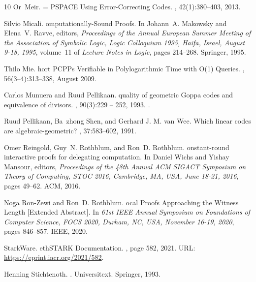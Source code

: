 \begin{thebibliography}{10}
Or~Meir.
 = {{P}{S}{P}{A}{C}{E}} {U}sing {E}rror-{C}orrecting {C}odes.
, 42(1):380--403, 2013.

Silvio Micali.
omputationally-{S}ound {P}roofs.
\newblock In Johann~A. Makowsky and Elena~V. Ravve, editors, {\em Proceedings
  of the Annual European Summer Meeting of the Association of Symbolic Logic,
  Logic Colloquium 1995, Haifa, Israel, August 9-18, 1995}, volume~11 of {\em
  Lecture Notes in Logic}, pages 214--268. Springer, 1995.

Thilo Mie.
hort {P}{C}{P}{P}s {V}erifiable in {P}olylogarithmic {T}ime with
  {O}(1) {Q}ueries.
,
  56(3–4):313–338, August 2009.

Carlos Munuera and Ruud Pellikaan.
quality of geometric {G}oppa codes and equivalence of divisors.
, 90(3):229 -- 252, 1993.
\newblock \href {https://doi.org/10.1016/0022-4049(93)90043-S}
  {}.

Ruud {Pellikaan}, Ba~zhong {Shen}, and Gerhard {J. M. van Wee}.
\newblock Which linear codes are algebraic-geometric?
, 37:583--602, 1991.

Omer Reingold, Guy~N. Rothblum, and Ron~D. Rothblum.
onstant-round interactive proofs for delegating computation.
\newblock In Daniel Wichs and Yishay Mansour, editors, {\em Proceedings of the
  48th Annual {ACM} {SIGACT} Symposium on Theory of Computing, {STOC} 2016,
  Cambridge, MA, USA, June 18-21, 2016}, pages 49--62. {ACM}, 2016.

Noga Ron{-}Zewi and Ron~D. Rothblum.
ocal {P}roofs {A}pproaching the {W}itness {L}ength [{E}xtended
  {A}bstract].
\newblock In {\em 61st {IEEE} Annual Symposium on Foundations of Computer
  Science, {FOCS} 2020, Durham, NC, USA, November 16-19, 2020}, pages 846--857.
  {IEEE}, 2020.

StarkWare.
\newblock eth{S}{T}{A}{R}{K} {D}ocumentation.
, page 582, 2021.
\newblock URL: \url{https://eprint.iacr.org/2021/582}.

Henning Stichtenoth.
.
\newblock Universitext. Springer, 1993.


\end{thebibliography}
